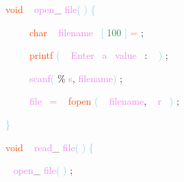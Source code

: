 \documentclass[8, usernames, dvipsnames]{beamer}
\begin{document}
\begin{frame}

 \textcolor{OrangeRed}{void}
\textcolor{White}{\ }
\textcolor{Violet}{open}\textcolor{Sepia}{\_}
\textcolor{Violet}{file}\textcolor{SkyBlue}{(}
\textcolor{SkyBlue}{)}
\textcolor{SkyBlue}{\{ }

 \textcolor{White}{\ }
\textcolor{White}{\ }
\textcolor{White}{\ }
\textcolor{OrangeRed}{char}
\textcolor{White}{\ }
\textcolor{Violet}{filename}\textcolor{White}{\ }
\textcolor{SkyBlue}{[}
\textcolor{SeaGreen}{100}
\textcolor{SkyBlue}{]}
\textcolor{Salmon}{=}
\textcolor{Sepia}{;}

 \textcolor{White}{\ }
\textcolor{White}{\ }
\textcolor{White}{\ }
\textcolor{OrangeRed}{printf}
\textcolor{SkyBlue}{(}
\textcolor{White}{\ }
\textcolor{Violet}{Enter}\textcolor{White}{\ }
\textcolor{Violet}{a}\textcolor{White}{\ }
\textcolor{Violet}{value}\textcolor{White}{\ }
\textcolor{Sepia}{:}
\textcolor{White}{\ }
\textcolor{SkyBlue}{)}
\textcolor{Sepia}{;}

 \textcolor{White}{\ }
\textcolor{White}{\ }
\textcolor{White}{\ }
\textcolor{Violet}{scanf}\textcolor{SkyBlue}{(}
\textcolor{Apricot}{\%}
\textcolor{Violet}{s}\textcolor{Sepia}{,}
\textcolor{Violet}{filename}\textcolor{SkyBlue}{)}
\textcolor{Sepia}{;}

 \textcolor{White}{\ }
\textcolor{White}{\ }
\textcolor{White}{\ }
\textcolor{Violet}{file}\textcolor{White}{\ }
\textcolor{Salmon}{=}
\textcolor{White}{\ }
\textcolor{OrangeRed}{fopen}
\textcolor{SkyBlue}{(}
\textcolor{White}{\ }
\textcolor{Violet}{filename}\textcolor{Sepia}{,}
\textcolor{White}{\ }
\textcolor{Violet}{r}\textcolor{White}{\ }
\textcolor{SkyBlue}{)}
\textcolor{Sepia}{;}

 \textcolor{SkyBlue}{\} }

 
 \textcolor{OrangeRed}{void}
\textcolor{White}{\ }
\textcolor{Violet}{read}\textcolor{Sepia}{\_}
\textcolor{Violet}{file}\textcolor{SkyBlue}{(}
\textcolor{SkyBlue}{)}
\textcolor{SkyBlue}{\{ }

 \textcolor{White}{\   }
\textcolor{Violet}{open}\textcolor{Sepia}{\_}
\textcolor{Violet}{file}\textcolor{SkyBlue}{(}
\textcolor{SkyBlue}{)}
\textcolor{Sepia}{;}

 \end{frame}
\end{document}

